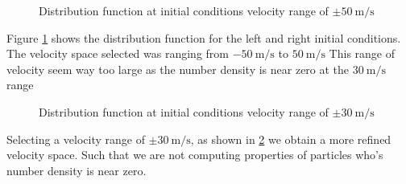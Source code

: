 \documentclass[paper=a4, fontsize=12pt]{scrartcl}
\begin{document}
\begin{figure}[H]%
    \centering
    \qquad
    \caption{Distribution function at initial conditions \newline velocity range of $\pm \SI{50}{\meter \per \second}$
 }
    \label{fig:init_50}%
\end{figure}
Figure \ref{fig:init_50} shows the distribution function for the left and right initial conditions.
The velocity space selected was ranging from $\SI{-50}{\meter \per \second}$ to $\SI{50}{\meter \per \second}$
This range of velocity seem way too large as the number density is near zero at the $\SI{30}{\meter \per \second}$
range
\begin{figure}[H]%
    \centering
    \qquad
    \caption{Distribution function at initial conditions \newline velocity range of $\pm \SI{30}{\meter \per \second}$
 }
    \label{fig:init_30}%
\end{figure}
Selecting a velocity range of $\pm \SI{30}{\meter \per \second}$, as shown in \ref{fig:init_30} we obtain
a more refined velocity space.
Such that we are not computing properties of particles who's number density is near zero.
\end{document}
